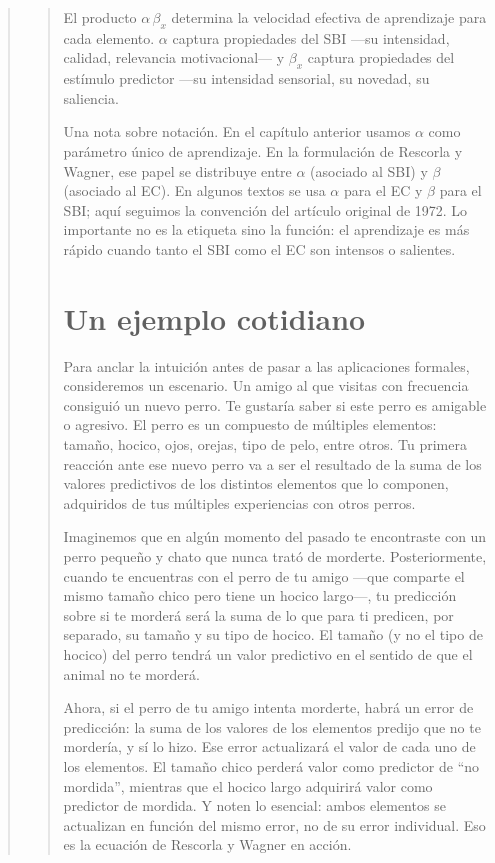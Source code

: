 \documentclass[
  letterpaper,
  DIV=11,
  numbers=noendperiod]{scrreprt}
\begin{document}
\begin{tcolorbox}[enhanced jigsaw, arc=.35mm, bottomrule=.15mm, breakable, colback=white, colframe=quarto-callout-note-color-frame, left=2mm, leftrule=.75mm, opacityback=0, rightrule=.15mm, toprule=.15mm]
\begin{quote}
\begin{quote}
El producto \(\alpha\,\beta_x\) determina la velocidad efectiva de
aprendizaje para cada elemento. \(\alpha\) captura propiedades del SBI
---su intensidad, calidad, relevancia motivacional--- y \(\beta_x\)
captura propiedades del estímulo predictor ---su intensidad sensorial,
su novedad, su saliencia.

Una nota sobre notación. En el capítulo anterior usamos \(\alpha\) como
parámetro único de aprendizaje. En la formulación de Rescorla y Wagner,
ese papel se distribuye entre \(\alpha\) (asociado al SBI) y \(\beta\)
(asociado al EC). En algunos textos se usa \(\alpha\) para el EC y
\(\beta\) para el SBI; aquí seguimos la convención del artículo original
de 1972. Lo importante no es la etiqueta sino la función: el aprendizaje
es más rápido cuando tanto el SBI como el EC son intensos o salientes.

\mbox{}%
\section{Un ejemplo cotidiano}\label{un-ejemplo-cotidiano}

Para anclar la intuición antes de pasar a las aplicaciones formales,
consideremos un escenario. Un amigo al que visitas con frecuencia
consiguió un nuevo perro. Te gustaría saber si este perro es amigable o
agresivo. El perro es un compuesto de múltiples elementos: tamaño,
hocico, ojos, orejas, tipo de pelo, entre otros. Tu primera reacción
ante ese nuevo perro va a ser el resultado de la suma de los valores
predictivos de los distintos elementos que lo componen, adquiridos de
tus múltiples experiencias con otros perros.

Imaginemos que en algún momento del pasado te encontraste con un perro
pequeño y chato que nunca trató de morderte. Posteriormente, cuando te
encuentras con el perro de tu amigo ---que comparte el mismo tamaño
chico pero tiene un hocico largo---, tu predicción sobre si te morderá
será la suma de lo que para ti predicen, por separado, su tamaño y su
tipo de hocico. El tamaño (y no el tipo de hocico) del perro tendrá un
valor predictivo en el sentido de que el animal no te morderá.

Ahora, si el perro de tu amigo intenta morderte, habrá un error de
predicción: la suma de los valores de los elementos predijo que no te
mordería, y sí lo hizo. Ese error actualizará el valor de cada uno de
los elementos. El tamaño chico perderá valor como predictor de ``no
mordida'', mientras que el hocico largo adquirirá valor como predictor
de mordida. Y noten lo esencial: ambos elementos se actualizan en
función del mismo error, no de su error individual. Eso es la ecuación
de Rescorla y Wagner en acción.


\end{quote}
\end{quote}
\end{tcolorbox}
\end{document}

